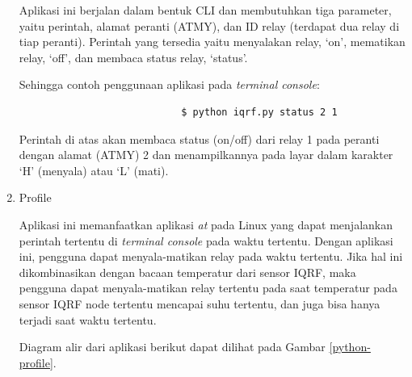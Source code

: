 \begin{enumerate}
					Aplikasi ini berjalan dalam bentuk CLI dan membutuhkan tiga parameter, yaitu perintah, alamat peranti (ATMY), dan ID relay (terdapat dua relay di tiap peranti). Perintah yang tersedia yaitu menyalakan relay, `on', mematikan relay, `off', dan membaca status relay, `status'.

					Sehingga contoh penggunaan aplikasi pada \emph{terminal console}:
					\begingroup
					    \fontsize{10pt}{12pt}\selectfont
					    \begin{verbatim}
					    	$ python iqrf.py status 2 1
					    \end{verbatim}  
					\endgroup
					Perintah di atas akan membaca status (on/off) dari relay 1 pada peranti dengan alamat (ATMY) 2 dan menampilkannya pada layar dalam karakter `H' (menyala) atau `L' (mati).

				\item Profile

					Aplikasi ini memanfaatkan aplikasi \emph{at} pada Linux yang dapat menjalankan perintah tertentu di \emph{terminal console} pada waktu tertentu. Dengan aplikasi ini, pengguna dapat menyala-matikan relay pada waktu tertentu. Jika hal ini dikombinasikan dengan bacaan temperatur dari sensor IQRF, maka pengguna dapat menyala-matikan relay tertentu pada saat temperatur pada sensor IQRF node tertentu mencapai suhu tertentu, dan juga bisa hanya terjadi saat waktu tertentu.

					Diagram alir dari aplikasi berikut dapat dilihat pada Gambar \ref{python-profile}.


\end{enumerate}
